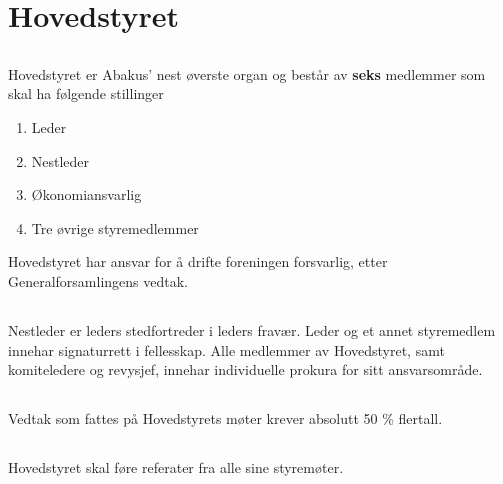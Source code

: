 \section{Hovedstyret}

\subsection{}
Hovedstyret er Abakus’ nest øverste organ og består av \textbf{seks} medlemmer som skal ha følgende stillinger 

\begin{enumerate}[label=\alph*)]
    \item Leder
    \item Nestleder
    \item Økonomiansvarlig
    \item Tre øvrige styremedlemmer
\end{enumerate}
Hovedstyret har ansvar for å drifte foreningen forsvarlig, etter Generalforsamlingens vedtak.
\subsection{}
Nestleder er leders stedfortreder i leders fravær. Leder og et annet styremedlem innehar signaturrett i fellesskap. 
Alle medlemmer av Hovedstyret, samt komiteledere og revysjef, innehar individuelle prokura for sitt ansvarsområde. 

\subsection{}
Vedtak som fattes på Hovedstyrets møter krever absolutt 50 \% flertall.

\subsection{}
Hovedstyret skal føre referater fra alle sine styremøter. 
